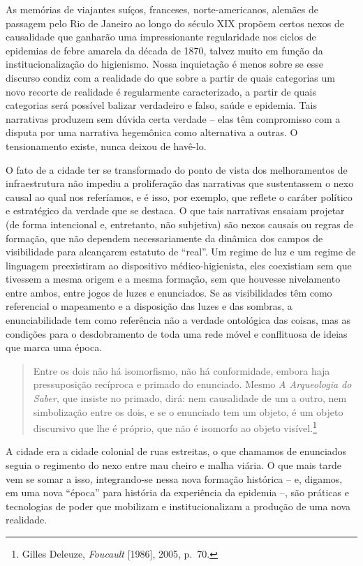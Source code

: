 As memórias de viajantes suíços, franceses, norte-americanos, alemães de
passagem pelo Rio de Janeiro ao longo do século XIX propõem certos nexos
de causalidade que ganharão uma impressionante regularidade nos ciclos
de epidemias de febre amarela da década de 1870, talvez muito em função
da institucionalização do higienismo. Nossa inquietação é menos sobre se
esse discurso condiz com a realidade do que sobre a partir de quais
categorias um novo recorte de realidade é regularmente caracterizado, a
partir de quais categorias será possível balizar verdadeiro e falso,
saúde e epidemia. Tais narrativas produzem sem dúvida certa verdade --
elas têm compromisso com a disputa por uma narrativa hegemônica como
alternativa a outras. O tensionamento existe, nunca deixou de havê-lo.

O fato de a cidade ter se transformado do ponto de vista dos
melhoramentos de infraestrutura não impediu a proliferação das
narrativas que sustentassem o nexo causal ao qual nos referíamos, e é
isso, por exemplo, que reflete o caráter político e estratégico da
verdade que se destaca. O que tais narrativas ensaiam projetar (de forma
intencional e, entretanto, não subjetiva) são nexos causais ou regras de
formação, que não dependem necessariamente da dinâmica dos campos de
visibilidade para alcançarem estatuto de ``real''. Um regime de luz e um
regime de linguagem preexistiram ao dispositivo médico-higienista, eles
coexistiam sem que tivessem a mesma origem e a mesma formação, sem que
houvesse nivelamento entre ambos, entre jogos de luzes e enunciados. Se
as visibilidades têm como referencial o mapeamento e a disposição das
luzes e das sombras, a enunciabilidade tem como referência não a verdade
ontológica das coisas, mas as condições para o desdobramento de toda uma
rede móvel e conflituosa de ideias que marca uma época.

\begin{quote}
Entre os dois não há isomorfismo, não há conformidade, embora haja
pressuposição recíproca e primado do enunciado. Mesmo \emph{A
Arqueologia do Saber}, que insiste no primado, dirá: nem causalidade de
um a outro, nem simbolização entre os dois, e se o enunciado tem um
objeto, é um objeto discursivo que lhe é próprio, que não é isomorfo ao
objeto visível.\footnote{Gilles Deleuze, \emph{Foucault} {[}1986{]},
  2005, p.~70.}
\end{quote}

A cidade era a cidade colonial de ruas estreitas, o que chamamos de
enunciados seguia o regimento do nexo entre mau cheiro e malha viária. O
que mais tarde vem se somar a isso, integrando-se nessa nova formação
histórica -- e, digamos, em uma nova ``época'' para história da
experiência da epidemia --, são práticas e tecnologias de poder que
mobilizam e institucionalizam a produção de uma nova realidade.

